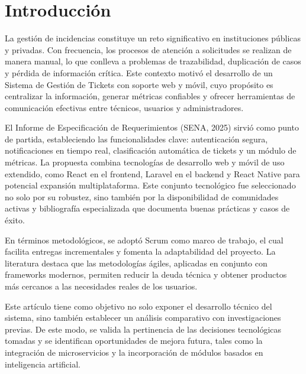 \section{Introducción}
La gestión de incidencias constituye un reto significativo en instituciones públicas y privadas. Con frecuencia, los procesos de atención a solicitudes se realizan de manera manual, lo que conlleva a problemas de trazabilidad, duplicación de casos y pérdida de información crítica. Este contexto motivó el desarrollo de un Sistema de Gestión de Tickets con soporte web y móvil, cuyo propósito es centralizar la información, generar métricas confiables y ofrecer herramientas de comunicación efectivas entre técnicos, usuarios y administradores.

El Informe de Especificación de Requerimientos (SENA, 2025) sirvió como punto de partida, estableciendo las funcionalidades clave: autenticación segura, notificaciones en tiempo real, clasificación automática de tickets y un módulo de métricas. La propuesta combina tecnologías de desarrollo web y móvil de uso extendido, como React en el frontend, Laravel en el backend \cite{subecz2021} y React Native para potencial expansión multiplataforma. Este conjunto tecnológico fue seleccionado no solo por su robustez, sino también por la disponibilidad de comunidades activas y bibliografía especializada que documenta buenas prácticas y casos de éxito.

En términos metodológicos, se adoptó Scrum como marco de trabajo, el cual facilita entregas incrementales y fomenta la adaptabilidad del proyecto. La literatura destaca que las metodologías ágiles, aplicadas en conjunto con frameworks modernos, permiten reducir la deuda técnica y obtener productos más cercanos a las necesidades reales de los usuarios.

Este artículo tiene como objetivo no solo exponer el desarrollo técnico del sistema, sino también establecer un análisis comparativo con investigaciones previas. De este modo, se valida la pertinencia de las decisiones tecnológicas tomadas y se identifican oportunidades de mejora futura, tales como la integración de microservicios y la incorporación de módulos basados en inteligencia artificial.